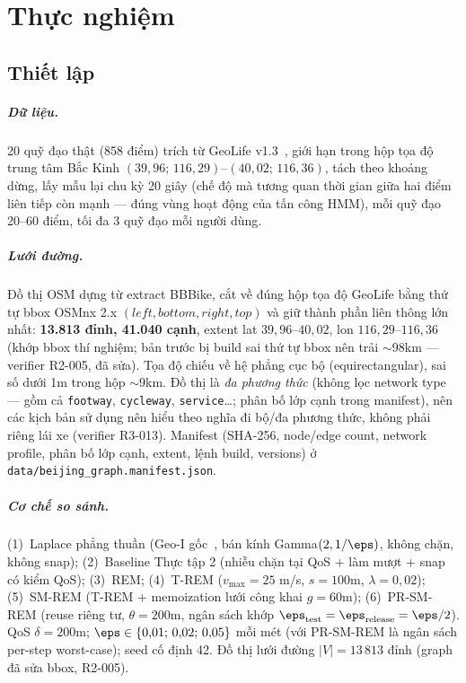 \chapter{Thực nghiệm}
\label{ch:thucnghiem}

\section{Thiết lập}

\paragraph{Dữ liệu.} 20 quỹ đạo thật (858 điểm) trích từ GeoLife
v1.3~\cite{zheng2010geolife}, giới hạn trong hộp tọa độ trung tâm Bắc Kinh
$(39{,}96;\,116{,}29)$--$(40{,}02;\,116{,}36)$, tách theo khoảng dừng, lấy mẫu
lại chu kỳ 20 giây (chế độ mà tương quan thời gian giữa hai điểm liên tiếp còn
mạnh --- đúng vùng hoạt động của tấn công HMM), mỗi quỹ đạo 20--60 điểm, tối đa
3 quỹ đạo mỗi người dùng.

\paragraph{Lưới đường.} Đồ thị OSM dựng từ extract BBBike, cắt về đúng hộp tọa độ
GeoLife bằng thứ tự bbox OSMnx 2.x $(left,bottom,right,top)$ và giữ thành phần liên
thông lớn nhất: \textbf{13.813 đỉnh, 41.040 cạnh}, extent lat $39{,}96$--$40{,}02$,
lon $116{,}29$--$116{,}36$ (khớp bbox thí nghiệm; bản trước bị build sai thứ tự
bbox nên trải $\sim$98km --- verifier R2-005, đã sửa). Tọa độ chiếu về hệ phẳng
cục bộ (equirectangular), sai số dưới 1m trong hộp $\sim$9km. Đồ thị là
\emph{đa phương thức} (không lọc network type --- gồm cả \texttt{footway},
\texttt{cycleway}, \texttt{service}\ldots; phân bố lớp cạnh trong manifest), nên
các kịch bản sử dụng nên hiểu theo nghĩa đi bộ/đa phương thức, không phải riêng
lái xe (verifier R3-013). Manifest (SHA-256, node/edge count, network profile,
phân bố lớp cạnh, extent, lệnh build, versions) ở
\texttt{data/beijing\_graph.manifest.json}.

\paragraph{Cơ chế so sánh.} (1)~Laplace phẳng thuần (Geo-I
gốc~\cite{andres2013geo}, bán kính Gamma$(2,1/\eps)$, không chặn, không snap);
(2)~Baseline Thực tập 2 (nhiễu chặn tại QoS + làm mượt + snap có kiểm QoS);
(3)~REM; (4)~T-REM ($v_{\max} = 25$ m/s, $s = 100$m, $\lambda = 0{,}02$);
(5)~SM-REM (T-REM + memoization lưới công khai $g = 60$m); (6)~PR-SM-REM (reuse
riêng tư, $\theta = 200$m, ngân sách khớp $\eps_{\text{test}}=\eps_{\text{release}}
=\eps/2$). QoS $\delta = 200$m; $\eps \in \{0{,}01;\, 0{,}02;\, 0{,}05\}$ mỗi mét
(với PR-SM-REM là ngân sách per-step worst-case); seed cố định 42. Đồ thị lưới
đường $|V|=13\,813$ đỉnh (graph đã sửa bbox, R2-005).


